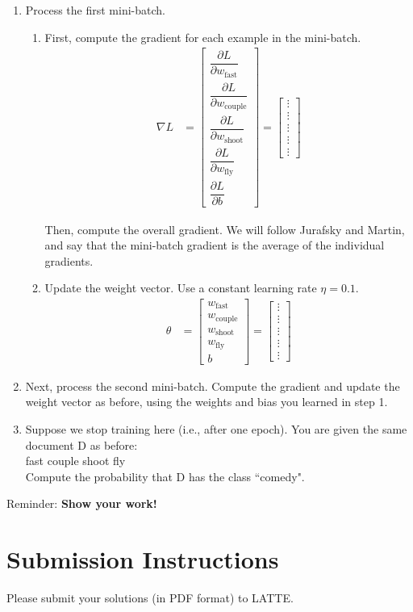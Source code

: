 \documentclass[11pt,letterpaper]{article}
\begin{document}
\begin{enumerate}
\item Process the first mini-batch.
\begin{enumerate}
\item First, compute the gradient for each example in the mini-batch.
\begin{align*}
\nabla L &= \begin{bmatrix}
\dfrac{\partial L}{\partial w_\mathrm{fast}} \\[11pt]
\dfrac{\partial L}{\partial w_\mathrm{couple}} \\[11pt]
\dfrac{\partial L}{\partial w_\mathrm{shoot}} \\[11pt]
\dfrac{\partial L}{\partial w_\mathrm{fly}} \\[11pt]
\dfrac{\partial L}{\partial b}
\end{bmatrix} = \begin{bmatrix}
\vdots \\[11pt]
\vdots \\[11pt]
\vdots \\[11pt]
\vdots \\[11pt]
\vdots
\end{bmatrix}
\end{align*}

Then, compute the overall gradient. We will follow Jurafsky and Martin, and say that the mini-batch gradient is the average of the individual gradients.
\item Update the weight vector. Use a constant learning rate $\eta=0.1$.
\begin{align*}
\theta &= \begin{bmatrix}
w_\mathrm{fast} \\[7pt]
w_\mathrm{couple} \\[7pt]
w_\mathrm{shoot} \\[7pt]
w_\mathrm{fly} \\[7pt]
b
\end{bmatrix} = \begin{bmatrix}
\vdots \\
\vdots \\
\vdots \\
\vdots \\
\vdots
\end{bmatrix}
\end{align*}

\end{enumerate}
\item Next, process the second mini-batch. Compute the gradient and update the weight vector as before, using the weights and bias you learned in step 1.
\item Suppose we stop training here (i.e., after one epoch). You are given the same document D as before:\\

\hspace{22pt}fast couple shoot fly\\

Compute the probability that D has the class ``comedy".
\end{enumerate}

\noindent Reminder: \textbf{Show your work!}

\section*{Submission Instructions}

Please submit your solutions (in PDF format) to LATTE.
\end{document}
